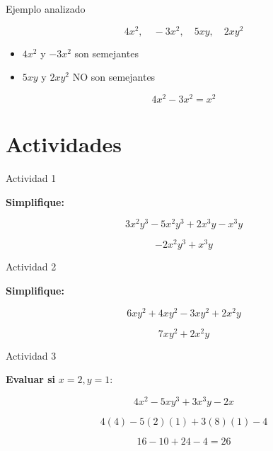 \begin{frame}{Ejemplo analizado}
	
	\[
	4x^2,\quad -3x^2,\quad 5xy,\quad 2xy^2
	\]
	
	\pause
	
	\begin{itemize}
		\item \(4x^2\) y \(-3x^2\) son semejantes
		\pause
		\item \(5xy\) y \(2xy^2\) NO son semejantes
	\end{itemize}
	
	\pause
	
	\[
	4x^2 - 3x^2 = x^2
	\]
	
	\pause
	
	
\end{frame}

\section{Actividades}
\begin{frame}{Actividad 1}
	
	\textbf{Simplifique:}
	
	\[
	3x^2y^3 - 5x^2y^3 + 2x^3y - x^3y
	\]
	
	\pause
	
	\[
	-2x^2y^3 + x^3y
	\]
	
\end{frame}

\begin{frame}{Actividad 2}
	
	\textbf{Simplifique:}
	
	\[
	6xy^2 + 4xy^2 - 3xy^2 + 2x^2y
	\]
	
	\pause
	
	\[
	7xy^2 + 2x^2y
	\]
	
\end{frame}

\begin{frame}{Actividad 3}
	
	\textbf{Evaluar si } \(x=2, y=1\):
	
	\[
	4x^2 - 5xy^3 + 3x^3y - 2x
	\]
	
	\pause
	
	\[
	4(4) - 5(2)(1) + 3(8)(1) - 4
	\]
	
	\pause
	
	\[
	16 -10 +24 -4 = 26
	\]
	
\end{frame}

